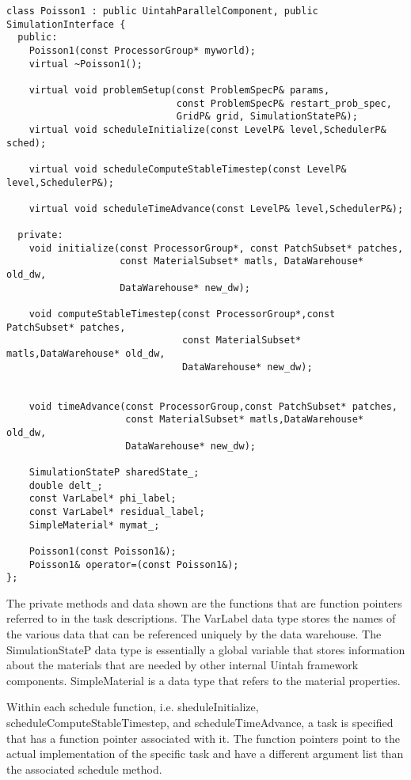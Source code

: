 \documentclass[12pt]{report}
\begin{document}
\begin{verbatim}
class Poisson1 : public UintahParallelComponent, public SimulationInterface {
  public:
    Poisson1(const ProcessorGroup* myworld);
    virtual ~Poisson1();

    virtual void problemSetup(const ProblemSpecP& params,
                              const ProblemSpecP& restart_prob_spec,
                              GridP& grid, SimulationStateP&);
    virtual void scheduleInitialize(const LevelP& level,SchedulerP& sched);

    virtual void scheduleComputeStableTimestep(const LevelP& level,SchedulerP&);

    virtual void scheduleTimeAdvance(const LevelP& level,SchedulerP&);

  private:
    void initialize(const ProcessorGroup*, const PatchSubset* patches,
                    const MaterialSubset* matls, DataWarehouse* old_dw,
                    DataWarehouse* new_dw);

    void computeStableTimestep(const ProcessorGroup*,const PatchSubset* patches,
                               const MaterialSubset* matls,DataWarehouse* old_dw,
                               DataWarehouse* new_dw);


    void timeAdvance(const ProcessorGroup,const PatchSubset* patches,
                     const MaterialSubset* matls,DataWarehouse* old_dw,
                     DataWarehouse* new_dw);

    SimulationStateP sharedState_;
    double delt_;
    const VarLabel* phi_label;
    const VarLabel* residual_label;
    SimpleMaterial* mymat_;

    Poisson1(const Poisson1&);
    Poisson1& operator=(const Poisson1&);
};
\end{verbatim}

The private methods and data shown are the functions that are function pointers referred to in the task descriptions.  The VarLabel data type stores the names of the various data that can be referenced uniquely by the data warehouse.  The SimulationStateP data type is essentially a global variable that stores information about the materials that are needed by other internal Uintah framework components.  SimpleMaterial is a data type that refers to the material properties.   

Within each schedule function, i.e. sheduleInitialize, scheduleComputeStableTimestep, and scheduleTimeAdvance, a task is specified that has a function pointer associated with it.  The function pointers point to the actual implementation of the specific task and have a different argument list than the associated schedule method.
\end{document}

